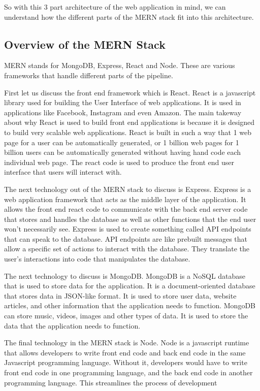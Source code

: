 \documentclass[sigconf]{acmart}
\begin{document}
So with this 3 part architecture of the web application in mind, we can understand how the different parts of the MERN stack fit into this architecture.


\subsection{Overview of the MERN Stack}

MERN stands for MongoDB, Express, React and Node. These are various frameworks that handle different parts of the pipeline.

First let us discuss the front end framework which is React. React is a javascript library used for building the User Interface of web applications. It is used in applications like Facebook, Instagram and even Amazon. The main takeway about why React is used to build front end applications is because it is designed to build very scalable web applications. React is built in such a way that 1 web page for a user can be automatically generated, or 1 billion web pages for 1 billion users can be automatically generated without having hand code each individual web page. The react code is used to produce the front end user interface that users will interact with.

The next technology out of the MERN stack to discuss is Express. Express is a web application framework that acts as the middle layer of the application. It allows the front end react code to communicate with the back end server code that stores  and handles the database as well as other functions that the end user won't necessarily see. Express is used to create something called API endpoints that can speak to the database. API endpoints are like prebuilt messages that allow a specific set of actions to interact with the database. They translate the user's interactions into code that manipulates the database.

The next technology to discuss is MongoDB. MongoDB is a NoSQL database that is used to store data for the application. It is a document-oriented database that stores data in JSON-like format. It is used to store user data, website articles, and other information that the application needs to function. MongoDB can store music, videos, images and other types of data. It is used to store the data that the application needs to function.

The final technology in the MERN stack is Node. Node is a javascript runtime that allows developers to write front end code and back end code in the same Javascript programming language. Without it, developers would have to write front end code in one programming language, and the back end code in another programming language. This streamlines the process of development
\end{document}
